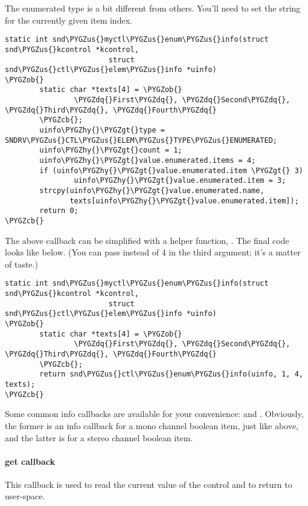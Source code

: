 \documentclass[a4paper,8pt,english]{sphinxmanual}
\def\PYGZus{\char`\_}
\def\PYGZob{\char`\{}
\def\PYGZcb{\char`\}}
\def\PYGZgt{\char`\>}
\def\PYGZhy{\char`\-}
\def\PYGZdq{\char`\"}
\begin{document}
The enumerated type is a bit different from others. You'll need to set
the string for the currently given item index.

\begin{Verbatim}[commandchars=\\\{\}]
static int snd\PYGZus{}myctl\PYGZus{}enum\PYGZus{}info(struct snd\PYGZus{}kcontrol *kcontrol,
                        struct snd\PYGZus{}ctl\PYGZus{}elem\PYGZus{}info *uinfo)
\PYGZob{}
        static char *texts[4] = \PYGZob{}
                \PYGZdq{}First\PYGZdq{}, \PYGZdq{}Second\PYGZdq{}, \PYGZdq{}Third\PYGZdq{}, \PYGZdq{}Fourth\PYGZdq{}
        \PYGZcb{};
        uinfo\PYGZhy{}\PYGZgt{}type = SNDRV\PYGZus{}CTL\PYGZus{}ELEM\PYGZus{}TYPE\PYGZus{}ENUMERATED;
        uinfo\PYGZhy{}\PYGZgt{}count = 1;
        uinfo\PYGZhy{}\PYGZgt{}value.enumerated.items = 4;
        if (uinfo\PYGZhy{}\PYGZgt{}value.enumerated.item \PYGZgt{} 3)
                uinfo\PYGZhy{}\PYGZgt{}value.enumerated.item = 3;
        strcpy(uinfo\PYGZhy{}\PYGZgt{}value.enumerated.name,
               texts[uinfo\PYGZhy{}\PYGZgt{}value.enumerated.item]);
        return 0;
\PYGZcb{}
\end{Verbatim}

The above callback can be simplified with a helper function,
. The final code looks like below.
(You can pass  instead of 4 in the third argument;
it's a matter of taste.)

\begin{Verbatim}[commandchars=\\\{\}]
static int snd\PYGZus{}myctl\PYGZus{}enum\PYGZus{}info(struct snd\PYGZus{}kcontrol *kcontrol,
                        struct snd\PYGZus{}ctl\PYGZus{}elem\PYGZus{}info *uinfo)
\PYGZob{}
        static char *texts[4] = \PYGZob{}
                \PYGZdq{}First\PYGZdq{}, \PYGZdq{}Second\PYGZdq{}, \PYGZdq{}Third\PYGZdq{}, \PYGZdq{}Fourth\PYGZdq{}
        \PYGZcb{};
        return snd\PYGZus{}ctl\PYGZus{}enum\PYGZus{}info(uinfo, 1, 4, texts);
\PYGZcb{}
\end{Verbatim}

Some common info callbacks are available for your convenience:
 and
. Obviously, the former
is an info callback for a mono channel boolean item, just like
 above, and the latter is for a
stereo channel boolean item.


\paragraph{get callback}
\label{sound/kernel-api/writing-an-alsa-driver:get-callback}
This callback is used to read the current value of the control and to
return to user-space.
\end{document}
